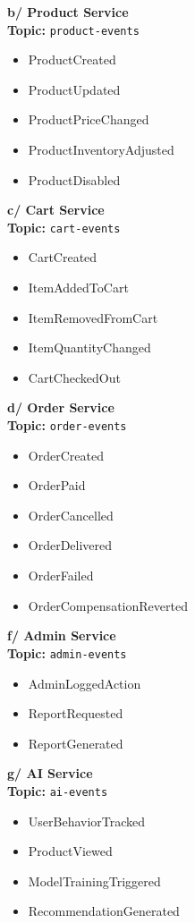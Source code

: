 \textbf{b/ Product Service} \\
\textbf{Topic:} \texttt{product-events}
\begin{itemize}
    \item ProductCreated
    \item ProductUpdated
    \item ProductPriceChanged
    \item ProductInventoryAdjusted
    \item ProductDisabled
\end{itemize}

\textbf{c/ Cart Service} \\
\textbf{Topic:} \texttt{cart-events}
\begin{itemize}
    \item CartCreated
    \item ItemAddedToCart
    \item ItemRemovedFromCart
    \item ItemQuantityChanged
    \item CartCheckedOut
\end{itemize}

\textbf{d/ Order Service} \\
\textbf{Topic:} \texttt{order-events}
\begin{itemize}
    \item OrderCreated
    \item OrderPaid
    \item OrderCancelled
    \item OrderDelivered
    \item OrderFailed
    \item OrderCompensationReverted
\end{itemize}

\textbf{f/ Admin Service} \\
\textbf{Topic:} \texttt{admin-events}
\begin{itemize}
    \item AdminLoggedAction
    \item ReportRequested
    \item ReportGenerated
\end{itemize}

\textbf{g/ AI Service} \\
\textbf{Topic:} \texttt{ai-events}
\begin{itemize}
    \item UserBehaviorTracked
    \item ProductViewed
    \item ModelTrainingTriggered
    \item RecommendationGenerated
\end{itemize}















